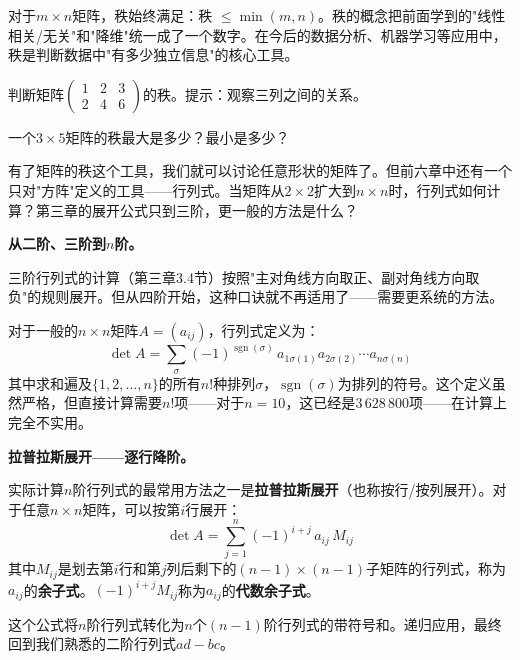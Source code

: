 对于$m\times n$矩阵，秩始终满足：秩 $\leq \min(m,n)$。秩的概念把前面学到的"线性相关/无关"和"降维"统一成了一个数字。在今后的数据分析、机器学习等应用中，秩是判断数据中"有多少独立信息"的核心工具。

\begin{exercise}
\item 判断矩阵$\begin{pmatrix}1&2&3\\2&4&6\end{pmatrix}$的秩。提示：观察三列之间的关系。
\item 一个$3\times5$矩阵的秩最大是多少？最小是多少？
\end{exercise}

有了矩阵的秩这个工具，我们就可以讨论任意形状的矩阵了。但前六章中还有一个只对"方阵"定义的工具——行列式。当矩阵从$2\times2$扩大到$n\times n$时，行列式如何计算？第三章的展开公式只到三阶，更一般的方法是什么？


\textbf{从二阶、三阶到$n$阶。}

三阶行列式的计算（第三章3.4节）按照"主对角线方向取正、副对角线方向取负"的规则展开。但从四阶开始，这种口诀就不再适用了——需要更系统的方法。

对于一般的$n\times n$矩阵$A=(a_{ij})$，行列式定义为：
\[
\det A = \sum_{\sigma}(-1)^{\operatorname{sgn}(\sigma)}\,a_{1\sigma(1)}a_{2\sigma(2)}\cdots a_{n\sigma(n)}
\]
其中求和遍及$\{1,2,\ldots,n\}$的所有$n!$种排列$\sigma$，$\operatorname{sgn}(\sigma)$为排列的符号。这个定义虽然严格，但直接计算需要$n!$项——对于$n=10$，这已经是$3\,628\,800$项——在计算上完全不实用。

\textbf{拉普拉斯展开——逐行降阶。}

实际计算$n$阶行列式的最常用方法之一是\textbf{拉普拉斯展开}（也称按行/按列展开）。对于任意$n\times n$矩阵，可以按第$i$行展开：
\[
\det A = \sum_{j=1}^{n} (-1)^{i+j}\,a_{ij}\,M_{ij}
\]
其中$M_{ij}$是划去第$i$行和第$j$列后剩下的$(n-1)\times(n-1)$子矩阵的行列式，称为$a_{ij}$的\textbf{余子式}。$(-1)^{i+j}M_{ij}$称为$a_{ij}$的\textbf{代数余子式}。

这个公式将$n$阶行列式转化为$n$个$(n-1)$阶行列式的带符号和。递归应用，最终回到我们熟悉的二阶行列式$ad-bc$。

